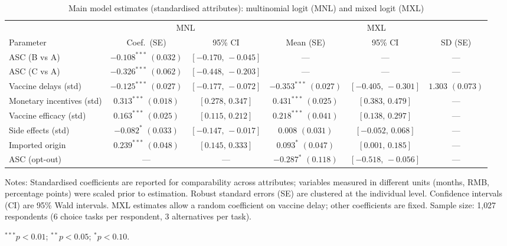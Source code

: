 \begin{table}[htbp]
\centering
\begin{threeparttable}
\caption{Main model estimates (standardised attributes): multinomial logit (MNL) and mixed logit (MXL)}
\label{tab:main_models}
\setlength{\tabcolsep}{3.8pt}
\footnotesize
\begin{tabular}{lccccc}
\toprule
& \multicolumn{2}{c}{MNL} & \multicolumn{3}{c}{MXL} \\
\cmidrule(lr){2-3}\cmidrule(lr){4-6}
Parameter
& Coef.\ (SE) & 95\% CI
& Mean (SE) & 95\% CI & SD (SE) \\
\midrule
ASC (B vs A)           & $-0.108^{***}$ $(0.032)$ & $[-0.170,\,-0.045]$ & ---                 & ---                 & ---           \\
ASC (C vs A)           & $-0.326^{***}$ $(0.062)$ & $[-0.448,\,-0.203]$ & ---                 & ---                 & ---           \\
Vaccine delays (std)    & $-0.125^{***}$ $(0.027)$ & $[-0.177,\,-0.072]$ & $-0.353^{***}$ $(0.027)$ & $[-0.405,\,-0.301]$ & $1.303$ $(0.073)$ \\
Monetary incentives (std)  & $ 0.313^{***}$ $(0.018)$ & $[ 0.278,\, 0.347]$ & $ 0.431^{***}$ $(0.025)$ & $[ 0.383,\, 0.479]$ & ---           \\
Vaccine efficacy (std) & $ 0.163^{***}$ $(0.025)$ & $[ 0.115,\, 0.212]$ & $ 0.218^{***}$ $(0.041)$ & $[ 0.138,\, 0.297]$ & ---           \\
Side effects (std)     & $-0.082^{*}$   $(0.033)$ & $[-0.147,\,-0.017]$ & $ 0.008$        $(0.031)$ & $[-0.052,\, 0.068]$ & ---           \\
Imported origin        & $ 0.239^{***}$ $(0.048)$ & $[ 0.145,\, 0.333]$ & $ 0.093^{*}$   $(0.047)$ & $[ 0.001,\, 0.185]$ & ---           \\
ASC (opt-out)          & ---                     & ---                 & $-0.287^{*}$   $(0.118)$ & $[-0.518,\,-0.056]$ & ---           \\
\bottomrule
\end{tabular}
\begin{tablenotes}[flushleft]
\footnotesize
\item Notes: Standardised coefficients are reported for comparability across attributes; variables
measured in different units (months, RMB, percentage points) were scaled prior to estimation.
Robust standard errors (SE) are clustered at the individual level. Confidence intervals (CI) are 
95\% Wald intervals. MXL estimates allow a random coefficient on vaccine delay; other 
coefficients are fixed. Sample size: 1{,}027 respondents (6 choice tasks per respondent, 3 
alternatives per task). 
\item[] $^{***} p<0.01$; $^{**} p<0.05$; $^{*} p<0.10$.
\end{tablenotes}
\end{threeparttable}
\end{table}




